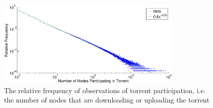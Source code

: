     \begin{figure}[t]
        \centering
        \includegraphics[width=0.8\textwidth]{Images/naturalDistribution.eps}
        \caption{The relative frequency of observations of torrent participation, i.e. the number of nodes that are downloading or uploading the torrent}
        \label{fig:dist}
    \end{figure}
